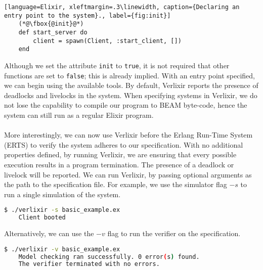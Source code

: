 \begin{lstlisting}[language=Elixir, xleftmargin=.3\linewidth, caption={Declaring an entry point to the system}., label={fig:init}]
    (*@\fbox{@init}@*)
    def start_server do
        client = spawn(Client, :start_client, [])
    end
\end{lstlisting}
Although we set the attribute \texttt{init} to \texttt{true}, it is not required that other functions are set to \texttt{false}; this is already implied. With an entry point specified, we can begin using the available tools. By default, Verlixir reports the presence of deadlocks and livelocks in the system. When specifying systems in Verlixir, we do not lose the capability to compile our program to BEAM byte-code, hence the system can still run as a regular Elixir program.
\\ \\
More interestingly, we can now use Verlixir before the Erlang Run-Time System (ERTS) to verify the system adheres to our specification. With no additional properties defined, by running Verlixir, we are ensuring that every possible execution results in a program termination. The presence of a deadlock or livelock will be reported. We can run Verlixir, by passing optional arguments as the path to the specification file. For example, we use the simulator flag $-s$ to run a single simulation of the system.
\begin{lstlisting}[language=bash, xleftmargin=.3\linewidth]
    $ ./verlixir -s basic_example.ex 
    Client booted
\end{lstlisting}
Alternatively, we can use the $-v$ flag to run the verifier on the specification.
\begin{lstlisting}[language=bash, xleftmargin=.3\linewidth]
    $ ./verlixir -v basic_example.ex 
    Model checking ran successfully. 0 error(s) found.
    The verifier terminated with no errors.
\end{lstlisting}
